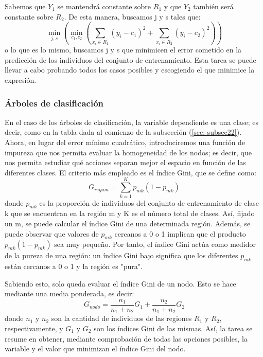 \documentclass[12pt,twoside]{article}
\begin{document}
Sabemos que $Y_1$ se mantendrá constante sobre $R_1$ y que $Y_2$ también será constante sobre $R_2$. De esta manera, buscamos j y s tales que:
\begin{equation*}
\min_{j,s}(\min_{c_1, c_2}(\sum_{x_i \in R_1}(y_i - c_1)^2 + \sum_{x_i \in R_2}(y_i - c_2)^2))
\end{equation*}
o lo que es lo mismo, buscamos j y s que minimicen el error cometido en la predicción de los individuos del conjunto de entrenamiento. Esta tarea se puede llevar a cabo probando todos los casos posibles y escogiendo el que minimice la expresión.


\subsubsection{Árboles de clasificación}
En el caso de los árboles de clasificación, la variable dependiente es una clase; es decir, como en la tabla dada al comienzo de la subsección (\ref{sec: subsec22}). Ahora, en lugar del error mínimo cuadrático, introduciremos una función de impureza que nos permita evaluar la homogeneidad de los nodos; es decir, que nos permita estudiar qué acciones separan mejor el espacio en función de las diferentes clases. El criterio más empleado es el índice Gini, que se define como:
\begin{equation*}
G_{region} = \sum_{k=1}^K p_{mk}(1 - p_{mk})
\end{equation*}
donde $p_{mk}$ es la proporción de individuos del conjunto de entrenamiento de clase k que se encuentran en la región m y K es el número total de clases. Así, fijado un m, se puede calcular el índice Gini de una determinada región. Además, se puede observar que valores de $p_{mk}$ cercanos a 0 o 1 implican que el producto $p_{mk}(1- p_{mk})$ sea muy pequeño. Por tanto, el índice Gini actúa como medidor de la pureza de una región: un índice Gini bajo significa que los diferentes $p_{mk}$ están cercanos a 0 o 1 y la región es "pura".

Sabiendo esto, solo queda evaluar el índice Gini de un nodo. Esto se hace mediante una media ponderada, es decir:
\begin{equation*}
G_{nodo} = \frac{n_1}{n_1 + n_2}G_1 + \frac{n_2}{n_1 + n_2}G_2
\end{equation*}
donde  $n_1$ y $n_2$ son la cantidad de individuos de las regiones $R_1$ y $R_2$, respectivamente, y $G_1$ y $G_2$ son los índices Gini de las mismas. Así, la tarea se resume en obtener, mediante comprobación de todas las opciones posibles, la variable y el valor que minimizan el índice Gini del nodo.
\end{document}
